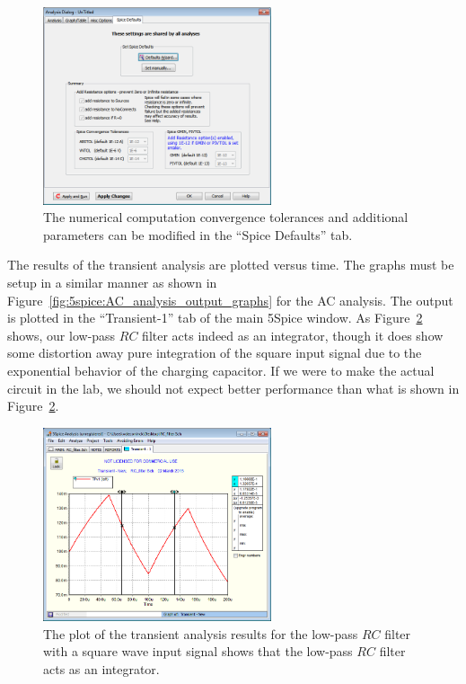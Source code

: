 \documentclass{article}
\begin{document}
\begin{figure}
\begin{center}
\includegraphics[width=0.6\textwidth]{pics/5spice_numerical_tolerances}
\end{center}
\caption{The numerical computation convergence tolerances and additional parameters can be modified in the ``Spice Defaults'' tab.}
\label{fig:5spice:numerical_tolerances}
\end{figure}

The results of the transient analysis are plotted versus time. The graphs must be setup in a similar manner as shown in Figure~\ref{fig:5spice:AC_analysis_output_graphs} for the AC analysis.  The output is plotted in the ``Transient-1'' tab of the main 5Spice window. As Figure~\ref{fig:5spice:transient_results} shows, our low-pass $RC$ filter acts indeed as an integrator, though it does show some distortion away pure integration of the square input signal due to the exponential behavior of the charging capacitor. If we were to make the actual circuit in the lab, we should not expect better performance than what is shown in Figure~\ref{fig:5spice:transient_results}.

\begin{figure}
\begin{center}
\includegraphics[width=0.6\textwidth]{pics/5spice_transient_results}
\end{center}
\caption{The plot of the transient analysis results for the low-pass $RC$ filter with a square wave input signal shows that the low-pass $RC$ filter acts as an integrator.}
\label{fig:5spice:transient_results}
\end{figure}
\end{document}
